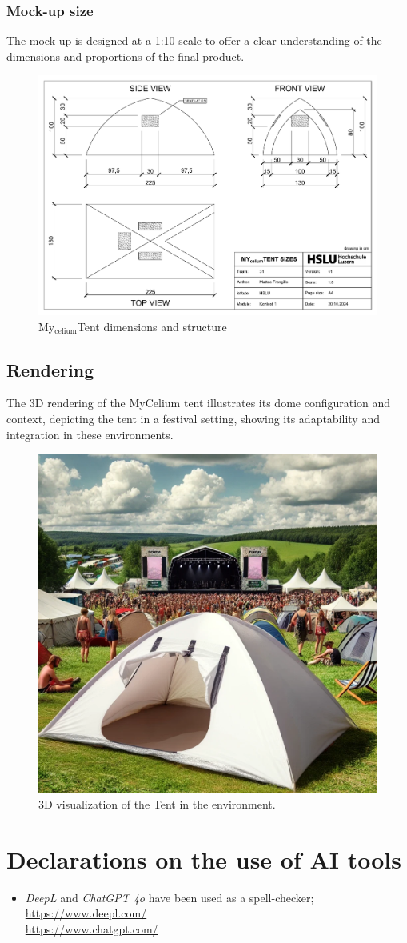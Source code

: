\documentclass{article}
\begin{document}
\subsubsection{Mock-up size}
The mock-up is designed at a 1:10 scale to offer a clear understanding of the dimensions
and proportions of the final product.
\vspace*{-.2cm}
\begin{figure}[ht!]
    \centering
    \includegraphics[width=\textwidth]{media/mytent-size.pdf}
    \caption{My$_{\text{celium}}$Tent dimensions and structure}
\end{figure}

\subsection{Rendering}
The 3D rendering of the MyCelium tent illustrates its dome configuration and context,
depicting the tent in a festival setting, showing its adaptability and integration in
these environments.

\begin{figure}[ht!]
    \centering
    \includegraphics[width=.55\textwidth]{media/3d-tent-rendering.png}
    \caption{3D visualization of the Tent in the environment.}
\end{figure}

\section{Declarations on the use of AI tools}
\begin{itemize}
    \item \textit{DeepL} and \textit{ChatGPT 4o} have been used as a spell-checker;\\
        \url{https://www.deepl.com/}\\
        \url{https://www.chatgpt.com/}
\end{itemize}

\newpage
\listoftables

\listoffigures
\end{document}

